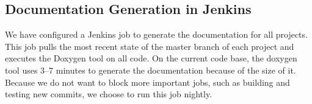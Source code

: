 \subsection{Documentation Generation in Jenkins}
We have configured a Jenkins job to generate the documentation for all projects. This job pulls the most recent state of the master branch of each project and executes the Doxygen tool on all code. On the current code base, the doxygen tool uses 3--7 minutes to generate the documentation because of the size of it. Because we do not want to block more important jobs, such as building and testing new commits, we choose to run this job nightly.